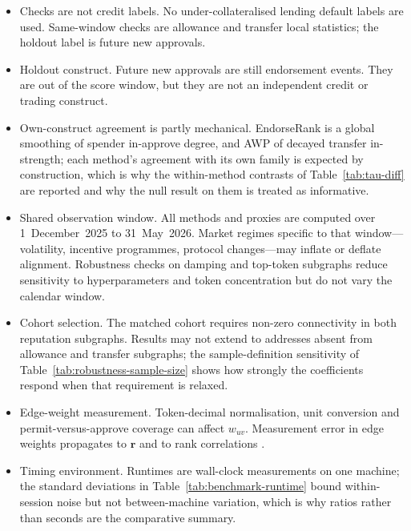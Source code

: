 \begin{itemize}
\item Checks are not credit labels. No under-collateralised lending default labels are used. Same-window checks are allowance and transfer local statistics; the holdout label is future new approvals.
\item Holdout construct. Future new approvals are still endorsement events. They are out of the score window, but they are not an independent credit or trading construct.
\item Own-construct agreement is partly mechanical. EndorseRank is a global smoothing of spender in-approve degree, and AWP of decayed transfer in-strength; each method's agreement with its own family is expected by construction, which is why the within-method contrasts of Table~\ref{tab:tau-diff} are reported and why the null result on them is treated as informative.
\end{itemize}


\begin{itemize}
\item Shared observation window. All methods and proxies are computed over 1~December~2025 to 31~May~2026. Market regimes specific to that window---volatility, incentive programmes, protocol changes---may inflate or deflate alignment. Robustness checks on damping and top-token subgraphs reduce sensitivity to hyperparameters and token concentration but do not vary the calendar window.
\item Cohort selection. The matched cohort requires non-zero connectivity in both reputation subgraphs. Results may not extend to addresses absent from allowance and transfer subgraphs; the sample-definition sensitivity of Table~\ref{tab:robustness-sample-size} shows how strongly the coefficients respond when that requirement is relaxed.
\item Edge-weight measurement. Token-decimal normalisation, unit conversion and permit-versus-approve coverage can affect $w_{uv}$. Measurement error in edge weights propagates to $\mathbf{r}$ and to rank correlations .
\item Timing environment. Runtimes are wall-clock measurements on one machine; the standard deviations in Table~\ref{tab:benchmark-runtime} bound within-session noise but not between-machine variation, which is why ratios rather than seconds are the comparative summary.
\end{itemize}

